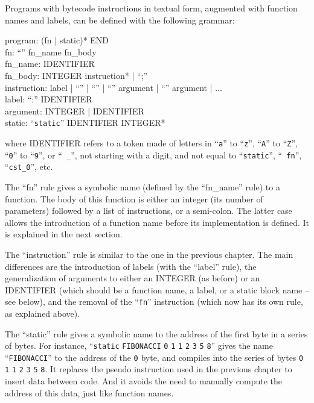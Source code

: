 Programs with bytecode instructions in textual form, augmented with function
names and labels, can be defined with the following grammar:

\begin{Paragraph}
program: (fn | static)* END\\
fn: ``'' fn\_name fn\_body\\
fn\_name: IDENTIFIER\\
fn\_body: INTEGER instruction* | ``;''\\
instruction: label | ``'' | ``'' | ``''
argument | ``'' argument | $\ldots$\\
label: ``:'' IDENTIFIER\\
argument: INTEGER | IDENTIFIER\\
static: ``{\tt static}'' IDENTIFIER INTEGER*
\end{Paragraph}

\noindent where IDENTIFIER refers to a token made of letters in ``{\tt a}'' to
``{\tt z}'', ``{\tt A}'' to ``{\tt Z}'', ``{\tt 0}'' to ``{\tt 9}'', or ``{\tt
\_}'', not starting with a digit, and not equal to ``{\tt static}'', ``{\tt
fn}'', ``{\tt cst\_0}'', etc.

The ``fn'' rule gives a symbolic name (defined by the ``fn\_name'' rule) to a
function. The body of this function is either an integer (its number of
parameters) followed by a list of instructions, or a semi-colon. The latter case
allows the introduction of a function name before its implementation is
defined. It is explained in the next section.

The ``instruction'' rule is similar to the one in the previous chapter. The
main differences are the introduction of labels (with the ``label'' rule), the
generalization of arguments to either an INTEGER (as before) or an IDENTIFIER
(which should be a function name, a label, or a static block name -- see
below), and the removal of the ``{\tt fn}'' instruction (which now has its own
rule, as explained above).

The ``static'' rule gives a symbolic name to the address of the first byte in a
series of bytes. For instance, ``{\tt static} {\tt FIBONACCI} {\tt 0} {\tt 1}
{\tt 1} {\tt 2} {\tt 3} {\tt 5} {\tt 8}'' gives the name ``{\tt FIBONACCI}'' to
the address of the {\tt 0} byte, and compiles into the series of bytes {\tt 0}
{\tt 1} {\tt 1} {\tt 2} {\tt 3} {\tt 5} {\tt 8}. It replaces the pseudo
 instruction used in the previous chapter to insert data between code.
And it avoids the need to manually compute the address of this data, just like
function names.

